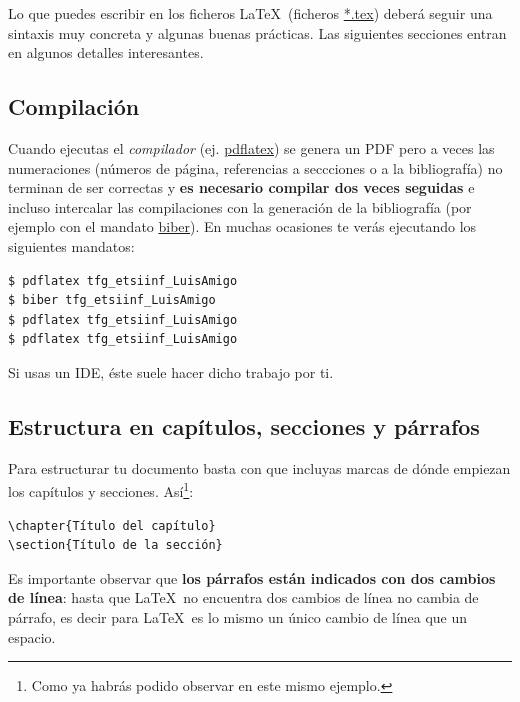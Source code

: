 Lo que puedes escribir en los ficheros \LaTeX\ (ficheros \url{*.tex})
deberá seguir una sintaxis muy concreta y algunas buenas
prácticas. Las siguientes secciones entran en algunos detalles
interesantes.

\subsection{Compilación}

Cuando ejecutas el \emph{compilador} (ej. \url{pdflatex}) se genera un
PDF pero a veces las numeraciones (números de página, referencias a
seccciones o a la bibliografía) no terminan de ser correctas y
\textbf{es necesario compilar dos veces seguidas} e incluso intercalar
las compilaciones con la generación de la bibliografía (por ejemplo
con el mandato \url{biber}). En muchas ocasiones te verás ejecutando
los siguientes mandatos:

\begin{verbatim}
$ pdflatex tfg_etsiinf_LuisAmigo
$ biber tfg_etsiinf_LuisAmigo
$ pdflatex tfg_etsiinf_LuisAmigo
$ pdflatex tfg_etsiinf_LuisAmigo
\end{verbatim}

Si usas un IDE, éste suele hacer dicho trabajo por ti.

\subsection{Estructura en capítulos, secciones y párrafos}

Para estructurar tu documento basta con que incluyas marcas de dónde
empiezan los capítulos y secciones. Así\footnote{Como ya habrás podido
  observar en este mismo ejemplo.}:

\begin{verbatim}
\chapter{Título del capítulo}
\section{Título de la sección}
\end{verbatim}

Es importante observar que \textbf{los párrafos están indicados con
  dos cambios de línea}: hasta que \LaTeX\ no encuentra dos cambios de
línea no cambia de párrafo, es decir para \LaTeX\ es lo mismo un único
cambio de línea que un espacio.

